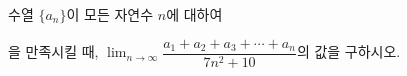 수열 $\{a_n\}$이 모든 자연수 $n$에 대하여 \par\smallskip{}\par\smallskip\noindent 을 만족시킬 때, $\displaystyle\lim_{n\to\infty}\dfrac{a_1+a_2+a_3+\cdots+a_n}{7n^2+10}$의 값을 구하시오.
